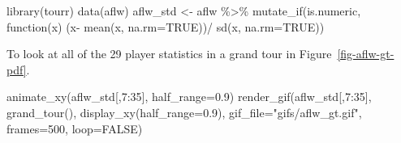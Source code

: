 \documentclass[
  letterpaper,
]{krantz}
\newenvironment{Shaded}{\begin{snugshade}}{\end{snugshade}}
\newcommand{\AttributeTok}[1]{\textcolor[rgb]{0.40,0.45,0.13}{#1}}
\newcommand{\ConstantTok}[1]{\textcolor[rgb]{0.56,0.35,0.01}{#1}}
\newcommand{\ControlFlowTok}[1]{\textcolor[rgb]{0.00,0.23,0.31}{#1}}
\newcommand{\DecValTok}[1]{\textcolor[rgb]{0.68,0.00,0.00}{#1}}
\newcommand{\FloatTok}[1]{\textcolor[rgb]{0.68,0.00,0.00}{#1}}
\newcommand{\FunctionTok}[1]{\textcolor[rgb]{0.28,0.35,0.67}{#1}}
\newcommand{\NormalTok}[1]{\textcolor[rgb]{0.00,0.23,0.31}{#1}}
\newcommand{\OtherTok}[1]{\textcolor[rgb]{0.00,0.23,0.31}{#1}}
\newcommand{\SpecialCharTok}[1]{\textcolor[rgb]{0.37,0.37,0.37}{#1}}
\newcommand{\StringTok}[1]{\textcolor[rgb]{0.13,0.47,0.30}{#1}}
\begin{document}
\begin{Shaded}
\begin{Highlighting}[]
\FunctionTok{library}\NormalTok{(tourr)}
\FunctionTok{data}\NormalTok{(aflw)}
\NormalTok{aflw\_std }\OtherTok{\textless{}{-}}\NormalTok{ aflw }\SpecialCharTok{\%\textgreater{}\%}
  \FunctionTok{mutate\_if}\NormalTok{(is.numeric, }\ControlFlowTok{function}\NormalTok{(x) (x}\SpecialCharTok{{-}}
      \FunctionTok{mean}\NormalTok{(x, }\AttributeTok{na.rm=}\ConstantTok{TRUE}\NormalTok{))}\SpecialCharTok{/}
      \FunctionTok{sd}\NormalTok{(x, }\AttributeTok{na.rm=}\ConstantTok{TRUE}\NormalTok{))}
\end{Highlighting}
\end{Shaded}

To look at all of the 29 player statistics in a grand tour in
Figure~\ref{fig-aflw-gt-pdf}.

\begin{Shaded}
\begin{Highlighting}[]
\FunctionTok{animate\_xy}\NormalTok{(aflw\_std[,}\DecValTok{7}\SpecialCharTok{:}\DecValTok{35}\NormalTok{], }\AttributeTok{half\_range=}\FloatTok{0.9}\NormalTok{)}
\FunctionTok{render\_gif}\NormalTok{(aflw\_std[,}\DecValTok{7}\SpecialCharTok{:}\DecValTok{35}\NormalTok{], }
           \FunctionTok{grand\_tour}\NormalTok{(), }
           \FunctionTok{display\_xy}\NormalTok{(}\AttributeTok{half\_range=}\FloatTok{0.9}\NormalTok{),}
           \AttributeTok{gif\_file=}\StringTok{"gifs/aflw\_gt.gif"}\NormalTok{,}
           \AttributeTok{frames=}\DecValTok{500}\NormalTok{,}
           \AttributeTok{loop=}\ConstantTok{FALSE}\NormalTok{)}
\end{Highlighting}
\end{Shaded}
\end{document}
